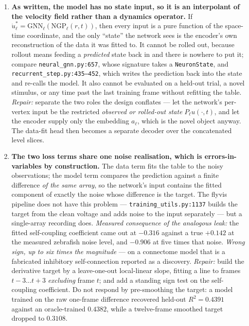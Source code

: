 \documentclass[11pt,a4paper]{article}
\begin{document}
\begin{enumerate}[leftmargin=1.6em,itemsep=5pt]
\item \textbf{As written, the model has no state input, so it is an interpolant of the
velocity field rather than a dynamics operator.} If
$\dot u_\ell^{*} = \mathrm{GNN}_\ell(\mathrm{NGP}_\ell(r,t))$, then every input is a pure
function of the space-time coordinate, and the only ``state'' the network sees is the
encoder's own reconstruction of the data it was fitted to. It cannot be rolled out, because
rollout means feeding a \emph{predicted} state back in and there is nowhere to put it;
compare \texttt{neural\_gnn.py:657}, whose signature takes a \texttt{NeuronState}, and
\texttt{recurrent\_step.py:435--452}, which writes the prediction back into the state and
re-calls the model. It also cannot be evaluated on a held-out trial, a novel stimulus, or
any time past the last training frame without refitting the table.
\emph{Repair:} separate the two roles the design conflates --- let the network's per-vertex
input be the restricted \emph{observed or rolled-out state} $P_\ell u(\cdot,t)$, and let the
encoder supply only the embedding $a_\ell$, which is the novel object anyway. The data-fit
head then becomes a separate decoder over the concatenated level slices.

\item \textbf{The two loss terms share one noise realisation, which is
errors-in-variables by construction.} The data term fits the table to the noisy
observations; the model term compares the prediction against a finite difference \emph{of
the same array}, so the network's input contains the fitted component of exactly the noise
whose difference is the target. The flyvis pipeline does not have this problem ---
\texttt{training\_utils.py:1137} builds the target from the clean voltage and adds noise to
the input separately --- but a single-array recording does.
\emph{Measured consequence of the analogous leak:} the fitted self-coupling coefficient came
out at $-0.316$ against a true $+0.142$ at the measured zebrafish noise level, and $-0.906$
at five times that noise. \emph{Wrong sign, up to six times the magnitude} --- on a
connectome model that is a fabricated inhibitory self-connection reported as a discovery.
\emph{Repair:} build the derivative target by a leave-one-out local-linear slope, fitting a
line to frames $t-3 \ldots t+3$ \emph{excluding} frame $t$; and add a standing sign test on
the self-coupling coefficient. Do not respond by pre-smoothing the target: a model trained
on the raw one-frame difference recovered held-out $R^2 = 0.4391$ against an oracle-trained
$0.4382$, while a twelve-frame smoothed target dropped to $0.3108$.


\end{enumerate}
\end{document}
